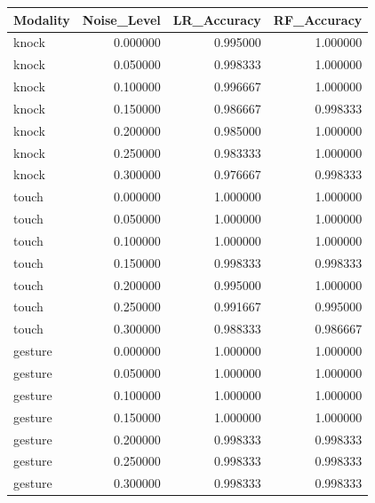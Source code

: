 \begin{tabular}{lrrr}
\toprule
Modality & Noise_Level & LR_Accuracy & RF_Accuracy \\
\midrule
knock & 0.000000 & 0.995000 & 1.000000 \\
knock & 0.050000 & 0.998333 & 1.000000 \\
knock & 0.100000 & 0.996667 & 1.000000 \\
knock & 0.150000 & 0.986667 & 0.998333 \\
knock & 0.200000 & 0.985000 & 1.000000 \\
knock & 0.250000 & 0.983333 & 1.000000 \\
knock & 0.300000 & 0.976667 & 0.998333 \\
touch & 0.000000 & 1.000000 & 1.000000 \\
touch & 0.050000 & 1.000000 & 1.000000 \\
touch & 0.100000 & 1.000000 & 1.000000 \\
touch & 0.150000 & 0.998333 & 0.998333 \\
touch & 0.200000 & 0.995000 & 1.000000 \\
touch & 0.250000 & 0.991667 & 0.995000 \\
touch & 0.300000 & 0.988333 & 0.986667 \\
gesture & 0.000000 & 1.000000 & 1.000000 \\
gesture & 0.050000 & 1.000000 & 1.000000 \\
gesture & 0.100000 & 1.000000 & 1.000000 \\
gesture & 0.150000 & 1.000000 & 1.000000 \\
gesture & 0.200000 & 0.998333 & 0.998333 \\
gesture & 0.250000 & 0.998333 & 0.998333 \\
gesture & 0.300000 & 0.998333 & 0.998333 \\
\bottomrule
\end{tabular}
